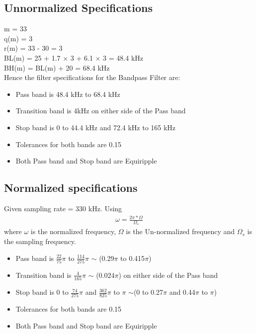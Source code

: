 \documentclass[12pt]{article}
\begin{document}
\subsection{Unnormalized Specifications}
\color{black}
m = 33\\
q(m) = 3\\
r(m) = 33 - 30 = 3\\
BL(m) = 25 + 1.7 $\times$ 3 + 6.1 $\times$ 3 = 48.4 kHz\\
BH(m) = BL(m) + 20 = 68.4 kHz\\

\noindent Hence the filter specifications for the Bandpass Filter are:
\begin{itemize}
	\item Pass band is 48.4 kHz to 68.4 kHz
	\item Transition band is 4kHz on either side of the Pass band
	\item Stop band is 0 to 44.4 kHz and 72.4 kHz to 165 kHz
	\item Tolerances for both bands are 0.15
	\item Both Pass band and Stop band are Equiripple
\end{itemize}

\color{cyan}
\subsection{Normalized specifications}
\color{black}
Given sampling rate  = 330 kHz. Using\\
\begin{gather*}
	\omega = \frac{2\pi \ast \Omega}{\Omega_s}
\end{gather*}
where $\omega$ is the normalized frequency, $\Omega$ is the Un-normalized frequency and $\Omega_s$ is the sampling frequency.
\begin{itemize}
	\item Pass band is $\frac{22}{75}\pi$ to $\frac{114}{275}\pi$ $\sim$ (0.29$\pi$ to 0.415$\pi$)
	\item Transition band is $\frac{4}{165}\pi$ $\sim$ (0.024$\pi$) on either side of the Pass band
	\item Stop band is 0 to  $\frac{74}{275}\pi$ and $\frac{362}{825}\pi$ to $\pi$  $\sim$(0 to 0.27$\pi$ and  0.44$\pi$ to $\pi$)
	\item Tolerances for both bands are 0.15
	\item Both Pass band and Stop band are Equiripple
\end{itemize}
\end{document}
